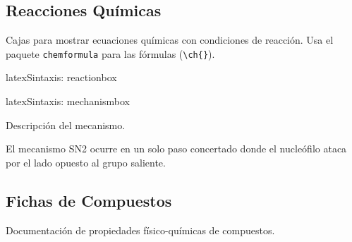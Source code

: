 \subsection{Reacciones Químicas}
\label{subsec:reacciones}

Cajas para mostrar ecuaciones químicas con condiciones de reacción.
Usa el paquete \texttt{chemformula} para las fórmulas (\verb|\ch{}|).


\begin{codigosimple}{latex}{Sintaxis: reactionbox}
\begin{reactionbox}[Título]
\end{reactionbox}
\end{codigosimple}

\begin{reactionbox}

\end{reactionbox}


\begin{codigosimple}{latex}{Sintaxis: mechanismbox}
\begin{mechanismbox}[Título]
  Descripción del mecanismo.
\end{mechanismbox}
\end{codigosimple}

\begin{mechanismbox}
  El mecanismo SN2 ocurre en un solo paso concertado donde el nucleófilo
  ataca por el lado opuesto al grupo saliente.

\end{mechanismbox}

\subsection{Fichas de Compuestos}
\label{subsec:compuestos}

Documentación de propiedades físico-químicas de compuestos.


